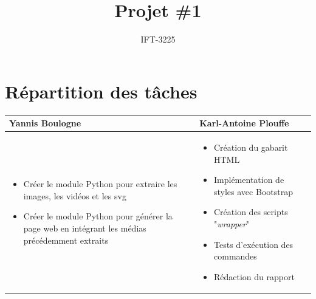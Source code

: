 \documentclass{article}
\title{Projet \#1}
\author{IFT-3225}
\begin{document}
\maketitle

\newcommand \mML {\ensuremath\mu\textsl{ML}}
\newcommand \kw [1] {\textsf{#1}}
\newcommand \id [1] {\textsl{#1}}
\newcommand \punc [1] {\kw{`#1'}}
\newcommand \str [1] {\texttt{"#1"}}
\newenvironment{outitemize}{
  \begin{itemize}
  \let \origitem \item \def \item {\origitem[]\hspace{-18pt}}
}{
  \end{itemize}
}
\newcommand \Align [2][t] {\begin{array}[#1]{@{}l} #2 \end{array}}

\section{Répartition des tâches}
\bgroup
\begin{table}[htbp]
\centering
    \setlength{\leftmargini}{0.5cm}
    \begin{tabular}{| m{5cm} | m{5cm} |}
        \hline
        Yannis Boulogne & Karl-Antoine Plouffe \\
        \hline
        \begin{itemize} 
            \item Créer le module Python pour extraire les images, les vidéos et les svg
            \item Créer le module Python pour générer la page web en intégrant les médias précédemment extraits
        \end{itemize} & 
        \begin{itemize} 
            \item Création du gabarit HTML
            \item Implémentation de styles avec Bootstrap
            \item Création des scripts "\textit{wrapper}"
            \item Tests d'exécution des commandes
            \item Rédaction du rapport
        \end{itemize} \\
        \hline
    \end{tabular}
\end{table}
\egroup
\end{document}
